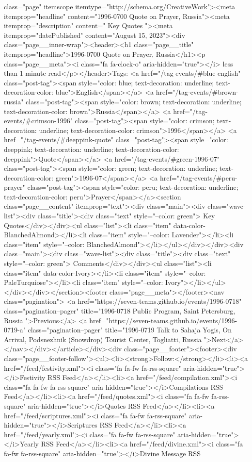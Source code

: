 class="page" itemscope itemtype="http://schema.org/CreativeWork"><meta itemprop="headline" content="1996-0700 Quote on Prayer, Russia"><meta itemprop="description" content=" Key Quotes "><meta itemprop="datePublished" content="August 15, 2023"><div class="page__inner-wrap"><header><h1 class="page__title" itemprop="headline">1996-0700 Quote on Prayer, Russia</h1><p class="page__meta"><i class="fa fa-clock-o" aria-hidden="true"></i> less than 1 minute read</p></header>Tags: <a href="/tag-events/#blue-english" class="post-tag"><span style="color: blue; text-decoration: underline; text-decoration-color: blue">English</span></a> <a href="/tag-events/#brown-russia" class="post-tag"><span style="color: brown; text-decoration: underline; text-decoration-color: brown">Russia</span></a> <a href="/tag-events/#crimson-1996" class="post-tag"><span style="color: crimson; text-decoration: underline; text-decoration-color: crimson">1996</span></a> <a href="/tag-events/#deeppink-quote" class="post-tag"><span style="color: deeppink; text-decoration: underline; text-decoration-color: deeppink">Quote</span></a> <a href="/tag-events/#green-1996-07" class="post-tag"><span style="color: green; text-decoration: underline; text-decoration-color: green">1996-07</span></a> <a href="/tag-events/#peru-prayer" class="post-tag"><span style="color: peru; text-decoration: underline; text-decoration-color: peru">Prayer</span></a><section class="page__content" itemprop="text"><div class="main"><div class="wave-list"><div class="title"><div class="text" style="--color: green"> Key Quotes</div></div><ul class="list"><li class="item" data-color-BlanchedAlmond></li><li class="item" style="--color: Lavender"></li><li class="item" style="--color: BlanchedAlmond"></li></ul></div></div><div class="main"><div class="wave-list"><div class="title"><div class="text" style="--color: green"> Comments</div></div><ul class="list"><li class="item" data-color-Ivory></li><li class="item" style="--color: PaleTurquiose"></li><li class="item" style="--color: Ivory"></li></ul></div></div></section><footer class="page__meta"></footer><nav class="pagination"> <a href="https://seven-teams.github.io/events/1996-0718" class="pagination--pager" title="1996-0718 Public Program, Saint Petersburg, Russia ">Previous</a> <a href="https://seven-teams.github.io/events/1996-0719-a" class="pagination--pager" title="1996-0719 Talk to Sahaja Yogis, On Arrival, Podsnezhnik (Snowdrop) Tourist Center, Togliatti, Russia ">Next</a></nav></div></article></div><div class="page__footer"><footer><div class="page__footer-follow"><ul><li><strong>Follow:</strong></li><li><a href="/feed/festivity.xml"><i class="fa fa-fw fa-rss-square" aria-hidden="true"></i>Festivity RSS Feed</a></li><li><a href="/feed/compilation.xml"><i class="fa fa-fw fa-rss-square" aria-hidden="true"></i>Compilations RSS Feed</a></li><li><a href="/feed/quotes.xml"><i class="fa fa-fw fa-rss-square" aria-hidden="true"></i>Quotes RSS Feed</a></li><li><a href="/feed/scriptures.xml"><i class="fa fa-fw fa-rss-square" aria-hidden="true"></i>Scriptures RSS Feed</a></li><li><a href="/feed/yearly.xml"><i class="fa fa-fw fa-rss-square" aria-hidden="true"></i>Yearly RSS Feed</a></li><li><a href="/feed/divine.xml"><i class="fa fa-fw fa-rss-square" aria-hidden="true"></i>Divine Message RSS 